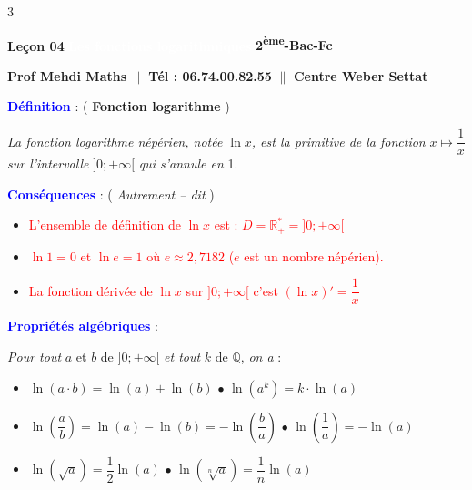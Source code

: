 \documentclass[a4paper,landscape]{article}
\begin{document}
\begin{multicols}{3}
\setlength{\columnseprule}{0.5pt}
\raggedcolumns

{\noindent\colorbox{jaune}{\textbf{Leçon 04}} \colorbox{rouge}{\textcolor{white}{\textbf{Les fonctions logarithmiques}}} \colorbox{jaune}{\textbf{2\textsuperscript{ème}-Bac-Fc}}}

\vspace{1mm}
\noindent\textbf{Prof Mehdi Maths} $\|$ \textbf{Tél : 06.74.00.82.55} $\|$ \textbf{Centre Weber Settat}

\vspace{1mm}
\noindent\textcolor{blue}{\textbf{Définition}} : ( \textbf{Fonction logarithme} )

\noindent\textit{La fonction logarithme népérien, notée $\ln x$, est la primitive de la fonction} $x \mapsto \dfrac{1}{x}$ \textit{sur l'intervalle} $]0;+\infty[$ \textit{qui s'annule en} 1.

\vspace{0.5mm}
\noindent\textcolor{blue}{\textbf{Conséquences}} : ( \textit{Autrement – dit} )

\begin{itemize}\setlength{\itemsep}{0pt}
\item \textcolor{red}{L'ensemble de définition de $\ln x$ est : $D = \mathbb{R}^*_+ = ]0;+\infty[$}
\item \textcolor{red}{$\ln 1 = 0$ et $\ln e = 1$ où $e \approx 2,7182$ ($e$ est un nombre népérien).}
\item \textcolor{red}{La fonction dérivée de $\ln x$ sur $]0;+\infty[$ c'est $(\ln x)' = \dfrac{1}{x}$}
\end{itemize}

\vspace{0.5mm}
\noindent\textcolor{blue}{\textbf{Propriétés algébriques}} :

\noindent\textit{Pour tout} $a$ et $b$ de $]0;+\infty[$ \textit{et tout} $k$ de $\mathbb{Q}$, \textit{on a} :

\begin{itemize}\setlength{\itemsep}{0pt}
\item $\ln(a \cdot b) = \ln(a) + \ln(b)$ \hspace{8mm} $\bullet$ $\ln(a^k) = k \cdot \ln(a)$
\item $\ln\left(\dfrac{a}{b}\right) = \ln(a) - \ln(b) = -\ln\left(\dfrac{b}{a}\right)$ \hspace{3mm} $\bullet$ $\ln\left(\dfrac{1}{a}\right) = -\ln(a)$
\item $\ln\left(\sqrt{a}\right) = \dfrac{1}{2}\ln(a)$ \hspace{12mm} $\bullet$ $\ln\left(\sqrt[n]{a}\right) = \dfrac{1}{n}\ln(a)$
\end{itemize}


\end{multicols}
\end{document}

